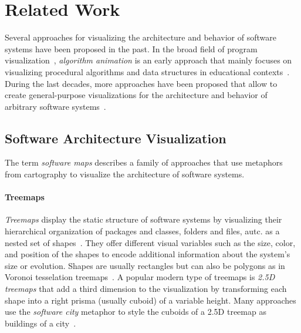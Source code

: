 \section{Related Work}
\label{sec:related_work}

Several approaches for visualizing the architecture and behavior of software systems have been proposed in the past.
In the broad field of program visualization~\cite{myers1986visual,sorva2013review,teyseyre2009overview}, \emph{algorithm animation} is an early approach that mainly focuses on visualizing procedural algorithms and data structures in educational contexts~\cite{brown1984system}.
During the last decades, more approaches have been proposed that allow to create general-purpose visualizations for the architecture and behavior of arbitrary software systems~\cite{reiss2006visualizing,cheng2008xdiva,chis2014moldable,devkota2022domain}.

\subsection{Software Architecture Visualization}

The term \emph{software maps} describes a family of approaches that use metaphors from cartography to visualize the architecture of software systems.

\paragraph{Treemaps}

\emph{Treemaps} display the static structure of software systems by visualizing their hierarchical organization of packages and classes, folders and files, autc. as a nested set of shapes~\cite{limberger2019advanced,limberger2022visual}.
They offer different visual variables such as the size, color, and position of the shapes to encode additional information about the system's size or evolution.
Shapes are usually rectangles but can also be polygons as in Voronoi tesselation treemaps~\cite{balzer2005voronoi}.
A popular modern type of treemaps is \emph{2.5D treemaps} that add a third dimension to the visualization by transforming each shape into a right prisma (usually cuboid) of a variable height.
Many approaches use the \emph{software city} metaphor to style the cuboids of a 2.5D treemap as buildings of a city~\cite{dugerdil2008execution,wettel2007visualizing,ardigo2021visualizing,mortara2021visualization,hoff2022utilizing,limberger2022visual}.

